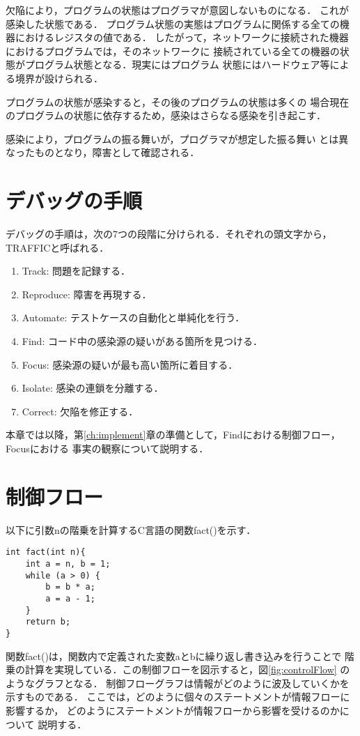 \documentclass{jreport}
\begin{document}
欠陥により，プログラムの状態はプログラマが意図しないものになる．
これが感染した状態である．
プログラム状態の実態はプログラムに関係する全ての機器におけるレジスタの値である．
したがって，ネットワークに接続された機器におけるプログラムでは，そのネットワークに
接続されている全ての機器の状態がプログラム状態となる．現実にはプログラム
状態にはハードウェア等による境界が設けられる．

プログラムの状態が感染すると，その後のプログラムの状態は多くの
場合現在のプログラムの状態に依存するため，感染はさらなる感染を引き起こす．

感染により，プログラムの振る舞いが，プログラマが想定した振る舞い
とは異なったものとなり，障害として確認される．

\section{デバッグの手順}
\label{sec:proc}
デバッグの手順は，次の7つの段階に分けられる．それぞれの頭文字から，
TRAFFICと呼ばれる．
\begin{enumerate}
  \item Track: 問題を記録する．
  \item Reproduce: 障害を再現する．
  \item Automate: テストケースの自動化と単純化を行う．
  \item Find: コード中の感染源の疑いがある箇所を見つける．
  \item Focus: 感染源の疑いが最も高い箇所に着目する．
  \item Isolate: 感染の連鎖を分離する．
  \item Correct: 欠陥を修正する．
\end{enumerate}

本章では以降，第\ref{ch:implement}章の準備として，Findにおける制御フロー，Focusにおける
事実の観察について説明する．

\section{制御フロー}
\label{sec:controlFlow}
以下に引数nの階乗を計算するC言語の関数fact()を示す．

\begin{Verbatim}
int fact(int n){
    int a = n, b = 1;
    while (a > 0) {
        b = b * a;
        a = a - 1;
    }
    return b;
}
\end{Verbatim}

関数fact()は，関数内で定義された変数aとbに繰り返し書き込みを行うことで
階乗の計算を実現している．この制御フローを図示すると，図\ref{fig:controlFlow}
のようなグラフとなる．
制御フローグラフは情報がどのように波及していくかを示すものである．
ここでは，どのように個々のステートメントが情報フローに影響するか，
どのようにステートメントが情報フローから影響を受けるのかについて
説明する．
\end{document}
